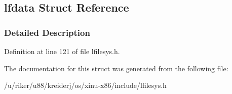 \hypertarget{structlfdata}{}\subsection{lfdata Struct Reference}
\label{structlfdata}


\subsubsection{Detailed Description}


Definition at line 121 of file lfilesys.\+h.



The documentation for this struct was generated from the following file\+:\begin{DoxyCompactItemize}
\item 
/u/riker/u88/kreiderj/os/xinu-\/x86/include/lfilesys.\+h\end{DoxyCompactItemize}
